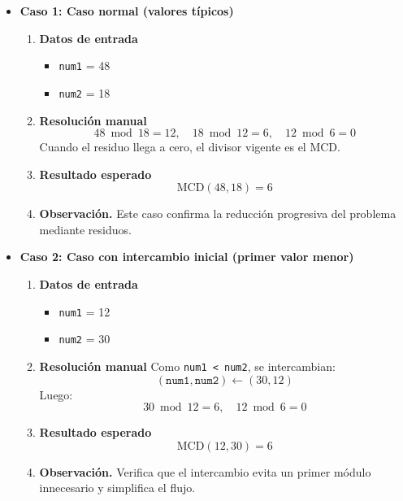 \documentclass[12pt,twoside]{book}
\begin{document}
						\begin{itemize}
							
							\item \textbf{Caso 1: Caso normal (valores típicos)}
							\begin{enumerate}
								\item \textbf{Datos de entrada}
								\begin{itemize}
									\item \texttt{num1} = 48
									\item \texttt{num2} = 18
								\end{itemize}
								\item \textbf{Resolución manual}
								\[
								48 \bmod 18 = 12,\quad 18 \bmod 12 = 6,\quad 12 \bmod 6 = 0
								\]
								Cuando el residuo llega a cero, el divisor vigente es el MCD.
								\item \textbf{Resultado esperado}
								\[
								\text{MCD}(48,18) = 6
								\]
								\item \textbf{Observación.} Este caso confirma la reducción progresiva del problema mediante residuos.
							\end{enumerate}
							
							
							\item \textbf{Caso 2: Caso con intercambio inicial (primer valor menor)}
							\begin{enumerate}
								\item \textbf{Datos de entrada}
								\begin{itemize}
									\item \texttt{num1} = 12
									\item \texttt{num2} = 30
								\end{itemize}
								\item \textbf{Resolución manual}
								Como \texttt{num1 < num2}, se intercambian:
								\[
								(\texttt{num1},\texttt{num2}) \leftarrow (30,12)
								\]
								Luego:
								\[
								30 \bmod 12 = 6,\quad 12 \bmod 6 = 0
								\]
								\item \textbf{Resultado esperado}
								\[
								\text{MCD}(12,30) = 6
								\]
								\item \textbf{Observación.} Verifica que el intercambio evita un primer módulo innecesario y simplifica el flujo.
							\end{enumerate}
							

\end{itemize}
\end{document}
